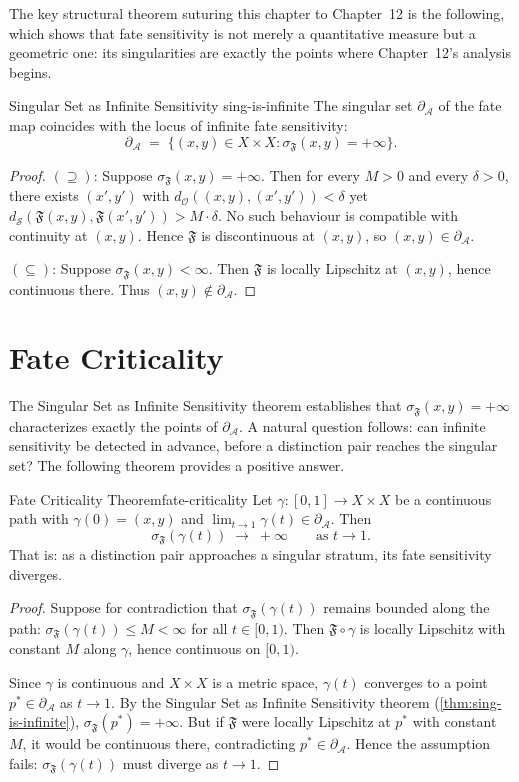 \documentclass[12pt,twoside,openright]{book}
\newcommand{\distPairs}{X\times X}
\newcommand{\fateMap}{\mathfrak{F}}
\newcommand{\fateSpace}{\mathcal{S}}
\newcommand{\fateDist}[2]{d_{\fateSpace}(#1,#2)}
\newcommand{\distDist}[2]{d_{\mathcal{O}}(#1,#2)}
\newcommand{\fateSens}[1]{\sigma_{\fateMap}(#1)}
\newcommand{\singSet}{\partial_{\!\mathcal{A}}}
\providecommand{\fateDist}[2]{d_{\fateSpace}(#1,#2)}
\providecommand{\distDist}[2]{d_{\mathcal{O}}(#1,#2)}
\providecommand{\fateSens}[1]{\sigma_{\fateMap}(#1)}
\providecommand{\singSet}{\partial_{\!\mathcal{A}}}
\begin{document}
The key structural theorem suturing this chapter to Chapter~12
is the following, which shows that fate sensitivity is not merely
a quantitative measure but a geometric one: its singularities
are exactly the points where Chapter~12's analysis begins.

\begin{theorem}{Singular Set as Infinite Sensitivity}%
  {sing-is-infinite}
The singular set $\singSet$ of the fate map coincides with the
locus of infinite fate sensitivity:
\[
  \singSet
  \;=\;
  \bigl\{(x,y)\in\distPairs : \fateSens{x,y}=+\infty\bigr\}.
\]
\begin{proof}
$(\supseteq)$: Suppose $\fateSens{x,y}=+\infty$. Then for
every $M>0$ and every $\delta>0$, there exists $(x',y')$ with
$\distDist{(x,y)}{(x',y')}<\delta$ yet
$\fateDist{\fateMap(x,y)}{\fateMap(x',y')}>M\cdot\delta$.
No such behaviour is compatible with continuity at $(x,y)$.
Hence $\fateMap$ is discontinuous at $(x,y)$, so
$(x,y)\in\singSet$.

$(\subseteq)$: Suppose $\fateSens{x,y}<\infty$. Then $\fateMap$
is locally Lipschitz at $(x,y)$, hence continuous there. Thus
$(x,y)\notin\singSet$.
\end{proof}
\end{theorem}

\section{Fate Criticality}

The Singular Set as Infinite Sensitivity theorem establishes
that $\fateSens{x,y}=+\infty$ characterizes exactly the points
of $\singSet$. A natural question follows: can infinite
sensitivity be detected in advance, before a distinction pair
reaches the singular set? The following theorem provides a
positive answer.

\begin{theorem}{Fate Criticality Theorem}{fate-criticality}
Let $\gamma:[0,1]\to\distPairs$ be a continuous path with
$\gamma(0)=(x,y)$ and $\lim_{t\to 1}\gamma(t)\in\singSet$.
Then
\[
  \fateSens{\gamma(t)}\;\longrightarrow\;+\infty
  \qquad\text{as }t\to 1.
\]
That is: as a distinction pair approaches a singular stratum,
its fate sensitivity diverges.
\begin{proof}
Suppose for contradiction that $\fateSens{\gamma(t)}$ remains
bounded along the path: $\fateSens{\gamma(t)}\le M<\infty$ for
all $t\in[0,1)$. Then $\fateMap\circ\gamma$ is locally Lipschitz
with constant $M$ along $\gamma$, hence continuous on $[0,1)$.

Since $\gamma$ is continuous and $\distPairs$ is a metric space,
$\gamma(t)$ converges to a point $p^*\in\singSet$ as $t\to 1$.
By the Singular Set as Infinite Sensitivity theorem
(\cref{thm:sing-is-infinite}), $\fateSens{p^*}=+\infty$.
But if $\fateMap$ were locally Lipschitz at $p^*$ with
constant $M$, it would be continuous there, contradicting
$p^*\in\singSet$. Hence the assumption fails: $\fateSens{\gamma(t)}$
must diverge as $t\to 1$.
\end{proof}
\end{theorem}
\end{document}
